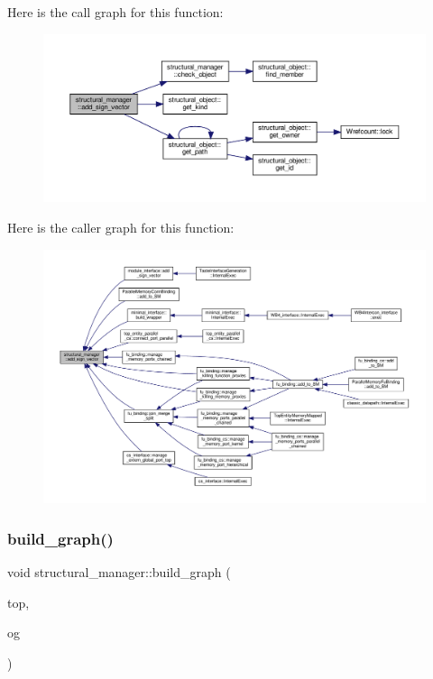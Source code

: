 Here is the call graph for this function\+:
\nopagebreak
\begin{figure}[H]
\begin{center}
\leavevmode
\includegraphics[width=350pt]{d7/d6b/classstructural__manager_a822fbb21039617033cdaf45842738804_cgraph}
\end{center}
\end{figure}
Here is the caller graph for this function\+:
\nopagebreak
\begin{figure}[H]
\begin{center}
\leavevmode
\includegraphics[width=350pt]{d7/d6b/classstructural__manager_a822fbb21039617033cdaf45842738804_icgraph}
\end{center}
\end{figure}
\mbox{\label{classstructural__manager_a67650e28126957ac872f1f747956b1b5}} 
\subsubsection{\texorpdfstring{build\+\_\+graph()}{build\_graph()}}
{\footnotesize\ttfamily void structural\+\_\+manager\+::build\+\_\+graph (\begin{DoxyParamCaption}\item[{const \hyperlink{structural__objects_8hpp_a8ea5f8cc50ab8f4c31e2751074ff60b2}{structural\+\_\+object\+Ref} \&}]{top,  }\item[{\hyperlink{structgraphs__collection}{graphs\+\_\+collection} $\ast$}]{og }\end{DoxyParamCaption})\hspace{0.3cm}{\ttfamily [private]}}



